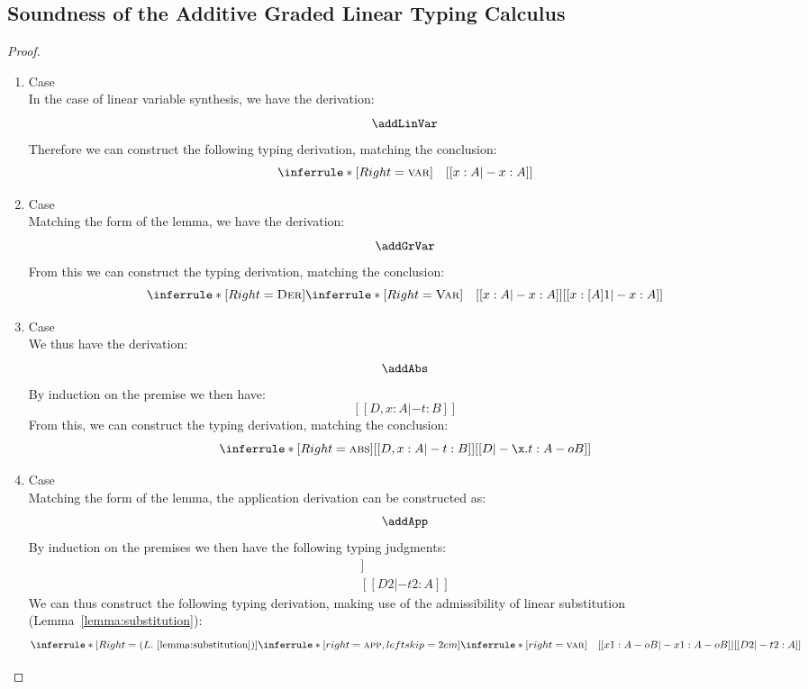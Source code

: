 \subsection{Soundness of the Additive Graded Linear Typing Calculus}
\label{proof:linear-add-sound}
\addSynthSound*
\begin{proof}

  \begin{enumerate}
    \item Case \addLinVarName \\
  In the case of linear variable synthesis, we have the derivation:
  \[
    \addLinVar
  \]
  Therefore we can construct the following typing derivation, matching the conclusion:
  \[
    \inferrule*[Right=\textsc{var}]
    {\quad}
    {[[ x : A |- x : A ]]}
  \]
    \item Case \addGrVarName\\
    Matching the form of the lemma, we have the derivation:
    \[
      \addGrVar
    \]
    From this we can construct the typing derivation, matching the conclusion:
    \[
      \inferrule*[Right=\textsc{Der}]
        {\inferrule*[Right=\textsc{Var}]
          {\quad}
          {[[ x : A |- x : A ]]}
        }
        {[[ x : [A] 1 |- x : A ]]}
    \]
    \item Case \addAbsName\\
    We thus have the derivation:
    \[
      \addAbs
    \]
    By induction on the premise we then have:
    \[
      [[ D, x : A |- t : B ]]
    \]
    From this, we can construct the typing derivation, matching the conclusion:
    \[
    \inferrule*[Right=\textsc{abs}]
    {[[ D, x : A |- t : B]]}{[[ D |- \x. t : A -o B ]]}
    \]
    \item Case \addAppName\\
    Matching the form of the lemma, the application derivation can be
    constructed as:
    \[
      \addApp
    \]
    By induction on the premises we then have the following typing
    judgments:
    \begin{align*}
      [[ D1, x2 : B |- t1 : C ]] \\
      [[ D2 |- t2 : A ]]
    \end{align*}
    We can thus construct the following typing derivation, making use
    of the admissibility of linear substitution
    (Lemma~\ref{lemma:substitution}):
    \[
    \inferrule*[Right=(L.~\ref{lemma:substitution})]
    {\inferrule*[right=\textsc{app}, leftskip=2em]
    {\inferrule*[right=\textsc{var}]
    {\quad}
    {[[x1 : A -o B |- x1 : A -o B ]]} \\ {[[  D2 |- t2 : A ]]}}
}\]
\end{enumerate}
\end{proof}
